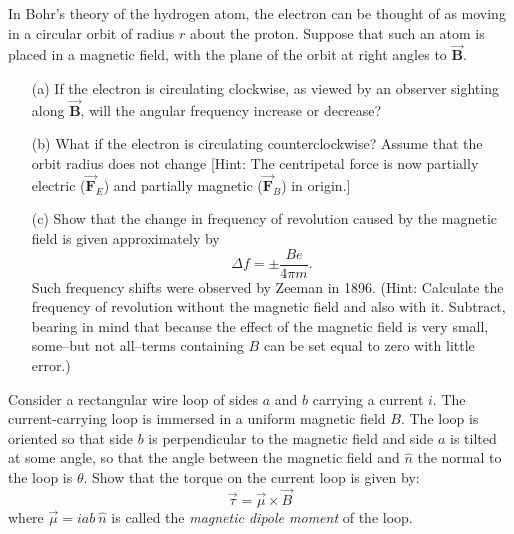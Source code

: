 \documentclass[12pt,letterpaper,boxed,cm]{hmcpset}
\newcommand{\f}[2]{\frac{#1}{#2}}
\begin{document}

\begin{problem}[32-P10]
In Bohr's theory of the hydrogen atom, the electron can be thought of as moving in a circular orbit of radius $r$ about the proton. Suppose that such an atom is placed in a magnetic field, with the plane of the orbit at right angles to $\vec{\mathbf{B}}$. 
\begin{enumerate}
	\item[(a)] If the electron is circulating clockwise, as viewed by an observer sighting along $\vec{\mathbf{B}}$, will the angular frequency increase or decrease?
	\item[(b)] What if the electron is circulating counterclockwise? Assume that the orbit radius does not change [Hint: The centripetal force is now partially electric ($\vec{\mathbf{F}}_E$) and partially magnetic ($\vec{\mathbf{F}}_B$) in origin.]
	\item[(c)] Show that the change in frequency of revolution caused by the magnetic field is given approximately by
\[
	\Delta f = \pm \f{Be}{4\pi m}.
\]
	Such frequency shifts were observed by Zeeman in 1896. (Hint: Calculate the frequency of revolution without the magnetic field and also with it. Subtract, bearing in mind that because the effect of the magnetic field is very small, some--but not all--terms containing $B$ can be set equal to zero with little error.)
\end{enumerate}
\end{problem}
\begin{solution}
\end{solution}
\newpage

\begin{problem}[SUP21]
Consider a rectangular wire loop of sides $a$ and $b$ carrying a current $i$. The current-carrying loop is immersed in a uniform magnetic field $B$. The loop is oriented so that side $b$ is perpendicular to the magnetic field and side $a$ is tilted at some angle, so that the angle between the magnetic field and $\hat{n}$ the normal to the loop is $\theta$. Show that the torque on the current loop is given by:
\[
	\vec{\tau} = \vec{\mu} \times \vec{B}
\]
where $\vec{\mu} = iab~\hat{n}$ is called the \textit{magnetic dipole moment} of the loop.
\end{problem}
\begin{solution}
\end{solution}
\newpage
\end{document}
